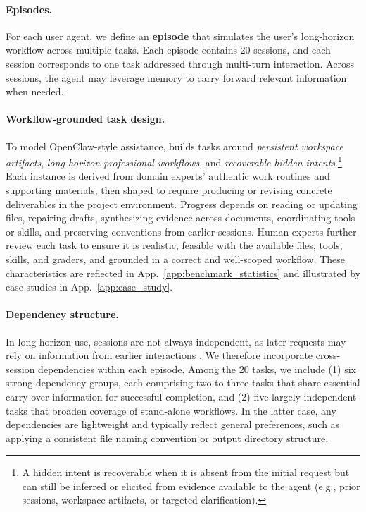 \paragraph{Episodes.}
For each user agent, we define an \textbf{episode} that simulates the user’s long-horizon workflow across multiple tasks. Each episode contains 20 sessions, and each session corresponds to one task addressed through multi-turn interaction. Across sessions, the agent may leverage memory to carry forward relevant information when needed.

\paragraph{Workflow-grounded task design.}
To model OpenClaw-style assistance, {\bench} builds tasks around \emph{persistent workspace artifacts}, \emph{long-horizon professional workflows}, and \emph{recoverable hidden intents}.\footnote{A hidden intent is recoverable when it is absent from the initial request but can still be inferred or elicited from evidence available to the agent (e.g., prior sessions, workspace artifacts, or targeted clarification).} Each instance is derived from domain experts' authentic work routines and supporting materials, then shaped to require producing or revising concrete deliverables in the project environment. Progress depends on reading or updating files, repairing drafts, synthesizing evidence across documents, coordinating tools or skills, and preserving conventions from earlier sessions. Human experts further review each task to ensure it is realistic, feasible with the available files, tools, skills, and graders, and grounded in a correct and well-scoped workflow. These characteristics are reflected in App.~\ref{app:benchmark_statistics} and illustrated by case studies in App.~\ref{app:case_study}.

\paragraph{Dependency structure.}
In long-horizon use, sessions are not always independent, as later requests may rely on information from earlier interactions \citep{he2026memoryarena}. We therefore incorporate cross-session dependencies within each episode. Among the 20 tasks, we include (1) six strong dependency groups, each comprising two to three tasks that share essential carry-over information for successful completion, and (2) five largely independent tasks that broaden coverage of stand-alone workflows. In the latter case, any dependencies are lightweight and typically reflect general preferences, such as applying a consistent file naming convention or output directory structure.

